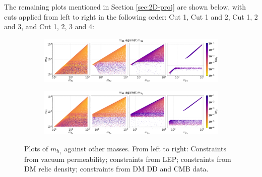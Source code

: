 \documentclass[12pt]{article}
\begin{document}
\label{sec:Appendix}
The remaining plots mentioned in Section \ref{sec:2D-proj} are shown below, with cuts applied from left to right in the following order: Cut 1, Cut 1 and 2, Cut 1, 2 and 3, and Cut 1, 2, 3 and 4:
\begin{figure}[H]
    \begin{subfigure}[b]{\columnwidth}
      \centering
      \includegraphics[width=1\columnwidth]{4plot/MD1_MD2.pdf}
    \end{subfigure}

    \begin{subfigure}[b]{\columnwidth}
      \centering
      \includegraphics[width=1\columnwidth]{4plot/MD1_MDP.pdf}
    \end{subfigure}
    \caption{Plots of $m_{h_1}$ against other masses. From left to right: Constraints from vacuum permeability; constraints from LEP; constraints from DM relic density; constraints from DM DD and CMB data.}
\end{figure}
\end{document}

